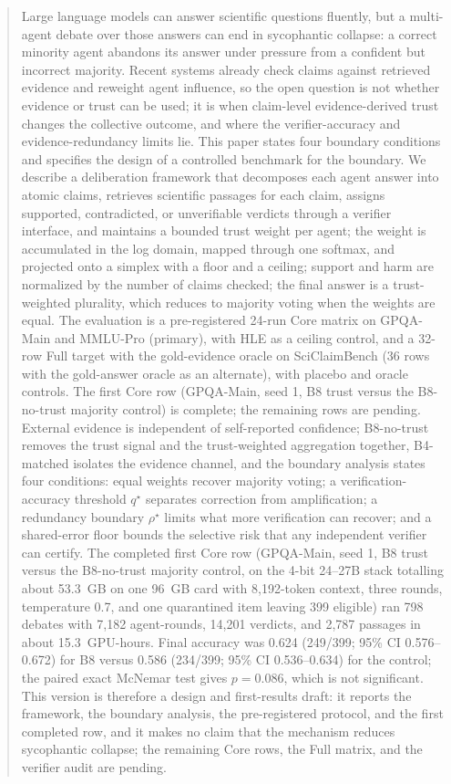 \documentclass[a4paper,fleqn]{cas-sc}
\begin{document}
\linenumbers
\begin{abstract}
  Large language models can answer scientific questions fluently, but a multi-agent debate over those answers can end in sycophantic collapse: a correct minority agent abandons its answer under pressure from a confident but incorrect majority. Recent systems already check claims against retrieved evidence and reweight agent influence, so the open question is not whether evidence or trust can be used; it is when claim-level evidence-derived trust changes the collective outcome, and where the verifier-accuracy and evidence-redundancy limits lie. This paper states four boundary conditions and specifies the design of a controlled benchmark for the boundary. We describe a deliberation framework that decomposes each agent answer into atomic claims, retrieves scientific passages for each claim, assigns supported, contradicted, or unverifiable verdicts through a verifier interface, and maintains a bounded trust weight per agent; the weight is accumulated in the log domain, mapped through one softmax, and projected onto a simplex with a floor and a ceiling; support and harm are normalized by the number of claims checked; the final answer is a trust-weighted plurality, which reduces to majority voting when the weights are equal. The evaluation is a pre-registered 24-run Core matrix on GPQA-Main and MMLU-Pro (primary), with HLE as a ceiling control, and a 32-row Full target with the gold-evidence oracle on SciClaimBench (36 rows with the gold-answer oracle as an alternate), with placebo and oracle controls. The first Core row (GPQA-Main, seed 1, B8 trust versus the B8-no-trust majority control) is complete; the remaining rows are pending. External evidence is independent of self-reported confidence; B8-no-trust removes the trust signal and the trust-weighted aggregation together, B4-matched isolates the evidence channel, and the boundary analysis states four conditions: equal weights recover majority voting; a verification-accuracy threshold $q^{\star}$ separates correction from amplification; a redundancy boundary $\rho^{\star}$ limits what more verification can recover; and a shared-error floor bounds the selective risk that any independent verifier can certify. The completed first Core row (GPQA-Main, seed 1, B8 trust versus the B8-no-trust majority control, on the 4-bit 24--27B stack totalling about 53.3~GB on one 96~GB card with 8,192-token context, three rounds, temperature 0.7, and one quarantined item leaving 399 eligible) ran 798 debates with 7,182 agent-rounds, 14,201 verdicts, and 2,787 passages in about 15.3~GPU-hours. Final accuracy was 0.624 (249/399; 95\% CI 0.576--0.672) for B8 versus 0.586 (234/399; 95\% CI 0.536--0.634) for the control; the paired exact McNemar test gives $p=0.086$, which is not significant. This version is therefore a design and first-results draft: it reports the framework, the boundary analysis, the pre-registered protocol, and the first completed row, and it makes no claim that the mechanism reduces sycophantic collapse; the remaining Core rows, the Full matrix, and the verifier audit are pending.

\end{abstract}
\end{document}
